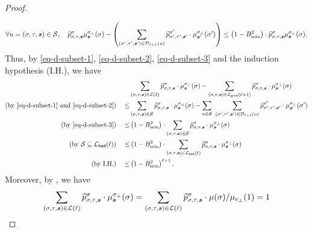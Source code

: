 \documentclass[11pt]{article}
\def\!#1{\mathtt{#1}}
\newcommand{\seqS}{\boldsymbol{s}}
\begin{document}
\begin{proof}
\begin{align}
\end{align}
\begin{align}\label{eq-d-subset-3}
\forall u=(\sigma,\tau,\seqS)\in \+S, \quad \widehat{p}^{\sigma}_{\sigma,\tau,\seqS}\mu^{\sigma_{\bot}}_{\seqS}(\sigma) - \left(\sum_{(\sigma',\tau',\seqS')\in \+D_{\ell+1}(u)} \widehat{p}^{\sigma'}_{\sigma',\tau',\seqS'}\cdot \mu^{\sigma_{\bot}}_{\seqS'}(\sigma') \right)\leq \left(1 - B_{\min}^2\right)\cdot\widehat{p}^{\sigma}_{\sigma,\tau,\seqS}\mu^{\sigma_{\bot}}_{\seqS}(\sigma).
\end{align}
Thus, by \eqref{eq-d-subset-1},  \eqref{eq-d-subset-2}, \eqref{eq-d-subset-3} and the induction hypothesis (I.H.), we have
\begin{equation}\label{eq-d-diff}
\begin{aligned}
 &\sum_{(\sigma,\tau, \seqS)\in \+L(\ell)} \widehat{p}^{\sigma}_{\sigma,\tau,\seqS}\cdot \mu^{\sigma_{\bot}}_{\seqS}(\sigma) - \sum_{(\sigma,\tau, \seqS)\in \+L_{\!{good}}(\ell+1)}\widehat{p}^{\sigma}_{\sigma,\tau,\seqS}\cdot \mu^{\sigma_{\bot}}_{\seqS}(\sigma)\\
\left(\text{by \eqref{eq-d-subset-1} and \eqref{eq-d-subset-2}}\right)\quad\leq& \sum_{(\sigma,\tau,\seqS)\in \+S}\widehat{p}^{\sigma}_{\sigma,\tau,\seqS}\cdot \mu^{\sigma_{\bot}}_{\seqS}(\sigma) - \sum_{u\in \+S}\ \sum_{(\sigma',\tau',\seqS')\in \+D_{\ell+1}(u)} \widehat{p}^{\sigma'}_{\sigma',\tau',\seqS'}\cdot \mu^{\sigma_{\bot}}_{\seqS'}(\sigma') \\
\left(\text{by \eqref{eq-d-subset-3}}\right)\quad \leq &
\left( 1 -B_{\min}^2\right)\cdot\sum_{(\sigma,\tau,\seqS)\in \+S}\widehat{p}^{\sigma}_{\sigma,\tau,\seqS}\cdot \mu^{\sigma_{\bot}}_{\seqS}(\sigma)\\
\left(\text{by $\+S\subseteq \+L_{\!{bad}}(\ell)$}\right)
\quad \leq &
\left( 1 -B_{\min}^2\right)\cdot\sum_{(\sigma,\tau,\seqS)\in \+L_{\!{bad}}(\ell)}\widehat{p}^{\sigma}_{\sigma,\tau,\seqS}\cdot \mu^{\sigma_{\bot}}_{\seqS}(\sigma)\\
\left(\text{by I.H.}\right)\quad \leq & \left(1-B_{\min}^2\right)^{\ell+1}.
\end{aligned}
\end{equation}
Moreover, by , we have
\begin{equation}\label{eq-lemma-ratio-identity-transform}
\begin{aligned}
    \sum_{(\sigma,\tau, \seqS)\in \+L(\ell)} \widehat{p}^{\sigma}_{\sigma,\tau,\seqS}\cdot \mu^{\sigma_{\bot}}_{\seqS}(\sigma) &= \sum_{(\sigma,\tau, \seqS)\in \+L(\ell)}\widehat{p}^{\sigma}_{\sigma,\tau,\seqS}\cdot \mu(\sigma)/\mu_{e_{\bot}}(1) = 1 \\

\end{aligned}
\end{equation}
\end{proof}
\end{document}
